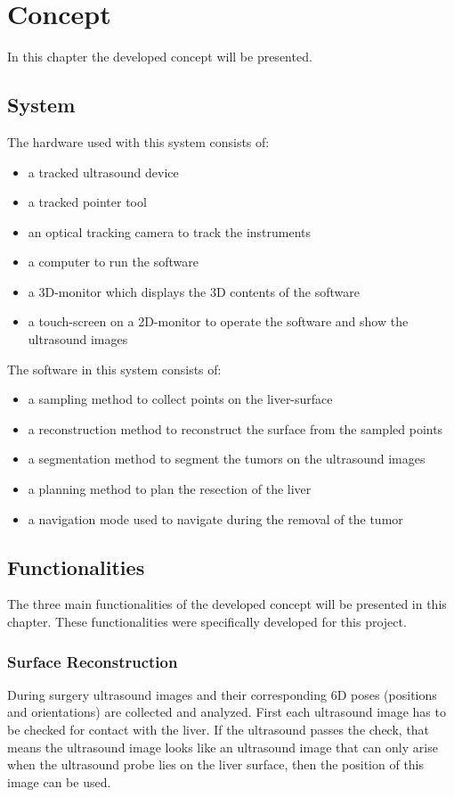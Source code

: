 \chapter{Concept}
In this chapter the developed concept will be presented. 
\section{System}
The hardware used with this system consists of:
\begin{itemize}
  \item a tracked ultrasound device
  \item a tracked pointer tool
  \item an optical tracking camera to track the instruments
  \item a computer to run the software
  \item a 3D-monitor which displays the 3D contents of the software 
  \item a touch-screen on a 2D-monitor to operate the software and show the
    ultrasound images
\end{itemize}
The software in this system consists of:
\begin{itemize}
  \item a sampling method to collect points on the liver-surface
  \item a reconstruction method to reconstruct the surface from the sampled points
  \item a segmentation method to segment the tumors on the ultrasound images
  \item a planning method to plan the resection of the liver
  \item a navigation mode used to navigate during the removal of the tumor
\end{itemize}
\section{Functionalities}
The three main functionalities of the developed concept will be presented in
this chapter. These functionalities were specifically developed for this project.
\subsection{Surface Reconstruction}
During surgery ultrasound images and their corresponding 6D poses (positions and
orientations) are collected and analyzed. First each ultrasound image has to be
checked for contact with the liver. If the ultrasound passes the check, that
means the ultrasound image looks like an ultrasound image that can only arise
when the ultrasound probe lies on the liver surface, then the position of this
image can be used.


